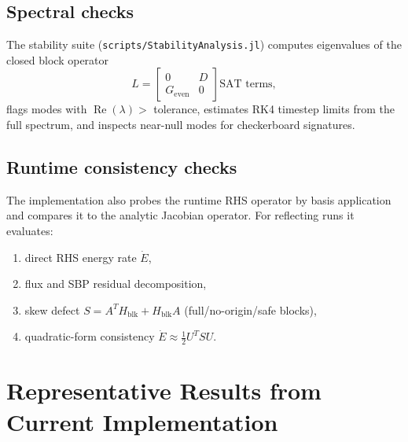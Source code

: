 \documentclass[
  aps,
  pre,
  reprint,
  superscriptaddress,
  nofootinbib
]{revtex4-2}
\newcommand{\Ge}{G_{\mathrm{even}}}
\begin{document}
\subsection{Spectral checks}
The stability suite (\texttt{scripts/StabilityAnalysis.jl}) computes eigenvalues of the
closed block operator
\begin{equation}
L=
\begin{bmatrix}
0 & D\\
\Ge & 0
\end{bmatrix}
\text{SAT terms},
\end{equation}
flags modes with $\operatorname{Re}(\lambda)>$ tolerance, estimates RK4 timestep limits
from the full spectrum, and inspects near-null modes for checkerboard signatures.

\subsection{Runtime consistency checks}
The implementation also probes the runtime RHS operator by basis application and compares
it to the analytic Jacobian operator. For reflecting runs it evaluates:
\begin{enumerate}
  \item direct RHS energy rate $\dot E$,
  \item flux and SBP residual decomposition,
  \item skew defect $S=A^T H_{\mathrm{blk}}+H_{\mathrm{blk}}A$ (full/no-origin/safe blocks),
  \item quadratic-form consistency $\dot E \approx \frac12 U^T S U$.
\end{enumerate}

\section{Representative Results from Current Implementation}
\end{document}
